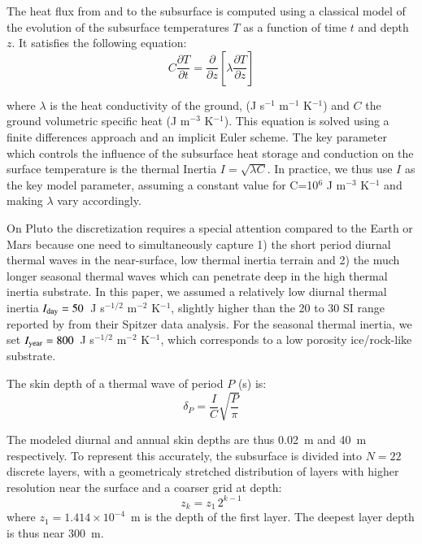 The heat flux from and to the subsurface is computed using a classical
model of the evolution of the subsurface temperatures $T$
as a function of time $t$ and depth $z$.  It satisfies the following equation:
\begin{equation} \label{eq:Heat1D}
C \frac{\partial T}{\partial t} =
\frac{\partial }{\partial z}
\left[ \lambda \frac{\partial T}{\partial z} \right]
\end{equation}

where $\lambda$ is the heat conductivity of the ground,
(J s$^{-1}$ m$^{-1}$ K$^{-1}$) and
$C$ the ground volumetric specific heat (J m$^{-3}$ K$^{-1}$).
This equation is solved using a finite differences approach and an implicit Euler
scheme.  
The key parameter which  controls the influence of the subsurface heat
storage and conduction on the surface temperature is the thermal Inertia
$I = \sqrt{\lambda C} $. In practice, we thus use $I$ as the key model
parameter, assuming a constant value for C=10$^6$ J m$^{-3}$ K$^{-1}$ and making
$\lambda$ vary accordingly.


On Pluto the discretization requires a special attention compared to the Earth or Mars
because one need to simultaneously capture 1) the short period 
diurnal thermal waves in the near-surface, low thermal inertia terrain and 2) the
much longer seasonal thermal waves which can penetrate deep in the high thermal inertia
substrate.  
In this paper, we assumed a relatively 
low diurnal thermal inertia $I_{\mbox{\scriptsize day}}=50$~J s$^{-1/2}$ m$^{-2}$
K$^{-1}$, slightly higher than the 20 to 30 SI range reported by 
\cite{Lell:11spitzer} from their Spitzer data analysis. For the 
seasonal thermal inertia, we set  $I_{\mbox{\scriptsize year}}=800$~J s$^{-1/2}$ m$^{-2}$
K$^{-1}$, which corresponds to a low porosity ice/rock-like substrate. 

The skin depth of a thermal wave of period $P$ (s) is:
\begin{equation}
\delta_{P} =  \frac{I}{C} \sqrt{\frac{P}{\pi}}
\end{equation}

The modeled diurnal and annual skin depths are thus 0.02~m and 40~m respectively.
To represent this accurately, the subsurface is divided into $N=22$ discrete 
layers, with a geometricaly stretched distribution of layers 
with higher resolution near the surface and
a  coarser grid at depth:
\begin{equation}
z_k = z_1 \, 2^{k-1}
\end{equation}
where $z_1 = 1.414 \times 10^{-4}$~m is the depth of the first layer. 
The deepest layer depth is thus near 300~m.

